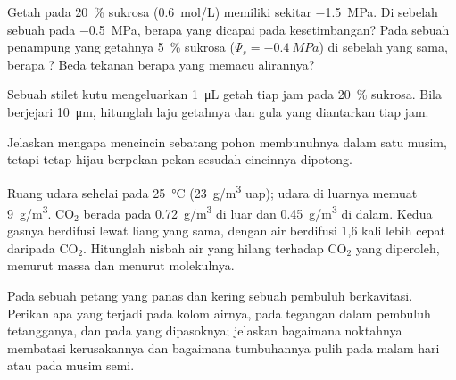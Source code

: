\begin{exercise}[$\star\star$]\label{exo:b1:plant-transport:7}
Getah  pada \qty{20}{\%} sukrosa (\qty{0.6}{mol/L}) memiliki
 sekitar \qty{-1.5}{MPa}. Di sebelah sebuah
 pada \qty{-0.5}{MPa}, berapa  yang dicapai 
pada kesetimbangan? Pada sebuah penampung yang getahnya \qty{5}{\%}
sukrosa ($\Psi_s = \qty{-0.4}{MPa}$) di sebelah  yang sama, berapa
? Beda tekanan berapa yang memacu alirannya?
\end{exercise}

\begin{exercise}[$\star\star$]\label{exo:b1:plant-transport:8}
Sebuah stilet kutu  mengeluarkan \qty{1}{\micro L} getah tiap jam
pada \qty{20}{\%} sukrosa. Bila  berjejari
\qty{10}{\micro m}, hitunglah laju getahnya dan gula yang diantarkan
tiap jam.
\end{exercise}

\begin{exercise}[$\star\star$]\label{exo:b1:plant-transport:9}
Jelaskan mengapa mencincin sebatang pohon membunuhnya dalam satu
musim, tetapi  tetap hijau berpekan-pekan sesudah cincinnya
dipotong.
\end{exercise}

\begin{exercise}[$\star\star\star$]\label{exo:b1:plant-transport:10}
Ruang udara sehelai   pada \qty{25}{\celsius}
(\qty{23}{g/m^3} uap); udara di luarnya memuat \qty{9}{g/m^3}.
$\mathrm{CO_2}$ berada pada \qty{0.72}{g/m^3} di luar dan
\qty{0.45}{g/m^3} di dalam. Kedua gasnya berdifusi lewat liang yang
sama, dengan air berdifusi 1,6 kali lebih cepat daripada
$\mathrm{CO_2}$. Hitunglah nisbah air yang hilang terhadap
$\mathrm{CO_2}$ yang diperoleh, menurut massa dan menurut molekulnya.
\end{exercise}

\begin{exercise}[$\star\star\star$]\label{exo:b1:plant-transport:11}
Pada sebuah petang yang panas dan kering sebuah pembuluh berkavitasi.
Perikan apa yang terjadi pada kolom airnya, pada tegangan dalam
pembuluh tetangganya, dan pada  yang dipasoknya; jelaskan bagaimana
noktahnya membatasi kerusakannya dan bagaimana tumbuhannya pulih pada
malam hari atau pada musim semi.
\end{exercise}

